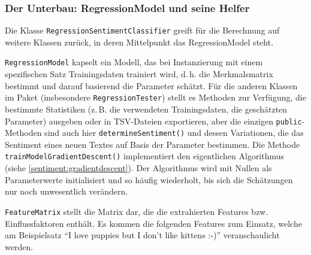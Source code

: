\subsubsection{Der Unterbau: RegressionModel und seine Helfer}
\label{sec:regressionmodel}

Die Klasse \texttt{Regression\-Sentiment\-Classifier} greift für die Berechnung auf weitere Klassen zurück, in deren Mittelpunkt das RegressionModel steht.

\texttt{Regression\-Model} kapselt ein Modell, das bei Instanzierung mit einem spezifischen Satz Trainingsdaten trainiert wird, d.\,h. die Merkmalsmatrix bestimmt und darauf basierend die Parameter schätzt. Für die anderen Klassen im Paket (insbesondere \texttt{Regression\-Tester}) stellt es Methoden zur Verfügung, die bestimmte Statistiken (z.\,B. die verwendeten Trainingsdaten, die geschätzten Parameter) ausgeben oder in TSV-Dateien exportieren, aber die einzigen \texttt{public}-Methoden sind auch hier \texttt{determine\-Sentiment()} und dessen Variationen, die das Sentiment eines neuen Textes auf Basis der Parameter bestimmen. Die Methode \texttt{train\-Model\-Gradient\-Descent()} implementiert den eigentlichen Algorithmus (siehe \ref{sentiment:gradientdescent}). Der Algorithmus wird mit Nullen als Parameterwerte initialisiert und so häufig wiederholt, bis sich die Schätzungen nur noch unwesentlich verändern.

\texttt{Feature\-Matrix} stellt die Matrix dar, die die extrahierten Features bzw. Einflussfaktoren enthält. Es kommen die folgenden Features zum Einsatz, welche am Beispielsatz "`I love puppies but I don't like kittens :-)"' veranschaulicht werden.

